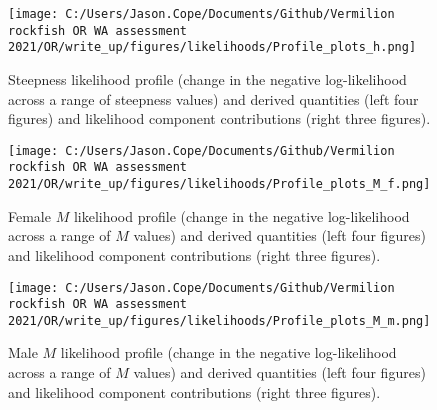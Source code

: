 \documentclass[11pt,
  english,
  a4paper,
]{article}
\begin{document}
\tagmcend\tagstructend


\begin{figure}
\centering
\texttt{[image: C:/Users/Jason.Cope/Documents/Github/Vermilion rockfish OR WA assessment 2021/OR/write\_up/figures/likelihoods/Profile\_plots\_h.png]}
\caption{Steepness likelihood profile (change in the negative log-likelihood across a range of steepness values) and derived quantities (left four figures) and likelihood component contributions (right three figures).\label{fig:steepness-profile-combo}}
\end{figure}

\tagmcend\tagstructend


\begin{figure}
\centering
\texttt{[image: C:/Users/Jason.Cope/Documents/Github/Vermilion rockfish OR WA assessment 2021/OR/write\_up/figures/likelihoods/Profile\_plots\_M\_f.png]}
\caption{Female {\(M\)\leavevmode\tagmcend\tagstructend} likelihood profile (change in the negative log-likelihood across a range of {\(M\)\leavevmode\tagmcend\tagstructend} values) and derived quantities (left four figures) and likelihood component contributions (right three figures).\label{fig:M_f-profile-combo}}
\end{figure}

\tagmcend\tagstructend


\begin{figure}
\centering
\texttt{[image: C:/Users/Jason.Cope/Documents/Github/Vermilion rockfish OR WA assessment 2021/OR/write\_up/figures/likelihoods/Profile\_plots\_M\_m.png]}
\caption{Male {\(M\)\leavevmode\tagmcend\tagstructend} likelihood profile (change in the negative log-likelihood across a range of {\(M\)\leavevmode\tagmcend\tagstructend} values) and derived quantities (left four figures) and likelihood component contributions (right three figures).\label{fig:M_m-profile-combo}}
\end{figure}
\end{document}
